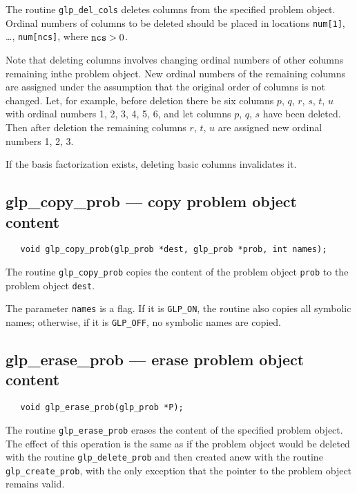 The routine \verb|glp_del_cols| deletes columns from the specified
problem object. Ordinal numbers of columns to be deleted should be
placed in locations \verb|num[1]|, \dots, \verb|num[ncs]|, where
${\tt ncs}>0$.

Note that deleting columns involves changing ordinal numbers of other
columns remaining in\linebreak the problem object. New ordinal numbers
of the remaining columns are assigned under the assumption that the
original order of columns is not changed. Let, for example, before
deletion  there be six columns $p$, $q$, $r$, $s$, $t$, $u$ with
ordinal numbers 1, 2, 3, 4, 5, 6, and let columns $p$, $q$, $s$ have
been deleted. Then after deletion the remaining columns $r$, $t$, $u$
are assigned new ordinal numbers 1, 2, 3.

If the basis factorization exists, deleting basic columns invalidates
it.

\subsection{glp\_copy\_prob --- copy problem object content}

\synopsis

\begin{verbatim}
   void glp_copy_prob(glp_prob *dest, glp_prob *prob, int names);
\end{verbatim}

\description

The routine \verb|glp_copy_prob| copies the content of the problem
object \verb|prob| to the problem object \verb|dest|.

The parameter \verb|names| is a flag. If it is \verb|GLP_ON|,
the routine also copies all symbolic names; otherwise, if it is
\verb|GLP_OFF|, no symbolic names are copied.

\subsection{glp\_erase\_prob --- erase problem object content}

\synopsis

\begin{verbatim}
   void glp_erase_prob(glp_prob *P);
\end{verbatim}

\description

The routine \verb|glp_erase_prob| erases the content of the specified
problem object. The effect of this operation is the same as if the
problem object would be deleted with the routine \verb|glp_delete_prob|
and then created anew with the routine \verb|glp_create_prob|, with the
only exception that the pointer to the problem object remains valid.

